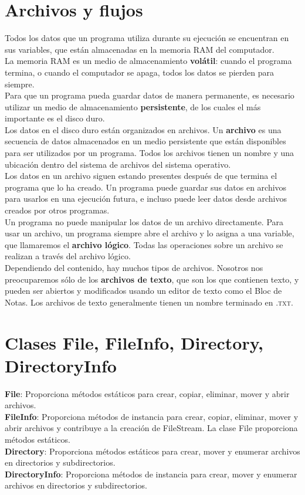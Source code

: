 \documentclass[12pt,a4paper]{report}
\begin{document}
\section{Archivos y flujos}
Todos los datos que un programa utiliza durante su ejecución se encuentran en sus variables, que están almacenadas en la memoria\textsc{ RAM} del computador.\\La memoria\textsc{ RAM} es un medio de almacenamiento\textbf{ volátil}: cuando el programa termina, o cuando el computador se apaga, todos los datos se pierden para siempre.\\Para que un programa pueda guardar datos de manera permanente, es necesario utilizar un medio de almacenamiento\textbf{ persistente}, de los cuales el más importante es el disco duro.\\Los datos en el disco duro están organizados en archivos. Un\textbf{ archivo} es una secuencia de datos almacenados en un medio persistente que están disponibles para ser utilizados por un programa. Todos los archivos tienen un nombre y una ubicación dentro del sistema de archivos del sistema operativo.\\Los datos en un archivo siguen estando presentes después de que termina el programa que lo ha creado. Un programa puede guardar sus datos en archivos para usarlos en una ejecución futura, e incluso puede leer datos desde archivos creados por otros programas.\\Un programa no puede manipular los datos de un archivo directamente. Para usar un archivo, un programa siempre abre el archivo y lo asigna a una variable, que llamaremos el\textbf{ archivo lógico}. Todas las operaciones sobre un archivo se realizan a través del archivo lógico.\\Dependiendo del contenido, hay muchos tipos de archivos. Nosotros nos preocuparemos sólo de los \textbf{ archivos de texto}, que son los que contienen texto, y pueden ser abiertos y modificados usando un editor de texto como el Bloc de Notas. Los archivos de texto generalmente tienen un nombre terminado en \textsc{.txt}.
\section{Clases File, FileInfo, Directory, DirectoryInfo}
\textbf{File}: Proporciona métodos estáticos para crear, copiar, eliminar, mover y abrir archivos.\\\textbf{FileInfo}: Proporciona métodos de instancia para crear, copiar, eliminar, mover y abrir archivos y contribuye a la creación de FileStream. La clase File proporciona métodos estáticos.\\\textbf{Directory}: Proporciona métodos estáticos para crear, mover y enumerar archivos en directorios y subdirectorios.\\\textbf{DirectoryInfo}: Proporciona métodos de instancia para crear, mover y enumerar archivos en directorios y subdirectorios.
\end{document}
